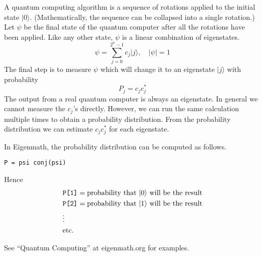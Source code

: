 \noindent
A quantum computing algorithm is a sequence of rotations
applied to the initial state $|0\rangle$.
(Mathematically, the sequence can be collapsed into a single rotation.)
Let $\psi$ be the final state of the quantum computer
after all the rotations have been applied.
Like any other state, $\psi$ is a linear combination of eigenstates.
\begin{equation*}
\psi=\sum_{j=0}^{2^n-1}c_j|j\rangle,\quad|\psi|=1
\end{equation*}
The final step is to measure $\psi$ which will
change it to an eigenstate $|j\rangle$ with
probability
\begin{equation*}
P_j=c_jc_j^*
\end{equation*}
The output from a real quantum computer is always an eigenstate.
In general we cannot measure the $c_j$'s directly.
However, we can run the same calculation multiple times
to obtain a probability distribution.
From the probability distribution we can estimate
$c_jc_j^*$ for each eigenstate.

\bigskip
\noindent
In Eigenmath, the probability distribution can be computed as follows.
\begin{center}
\tt P = psi conj(psi)
\end{center}

\noindent
Hence
\begin{align*}
&\text{\tt P[1]}=\text{probability that $|0\rangle$ will be the result}
\\
&\text{\tt P[2]}=\text{probability that $|1\rangle$ will be the result}
\\
&\vdots
\\
&\text{etc.}
\end{align*}

\noindent
See ``Quantum Computing'' at eigenmath.org for examples.
